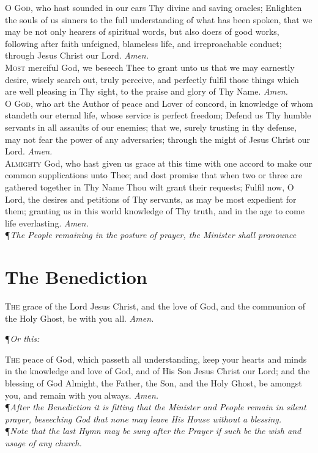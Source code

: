 \noindent\lettrine{O}{ God}, who hast sounded in our ears Thy divine and saving oracles; Enlighten the souls of us sinners to the full understanding of what has been spoken, that we may be not only hearers of spiritual words, but also doers of good works, following after faith unfeigned, blameless life, and irreproachable conduct; through Jesus Christ our Lord.
\textit{Amen.} \\

\noindent\lettrine{M}{ost} merciful God, we beseech Thee to grant unto us that we may earnestly desire, wisely search out, truly perceive, and perfectly fulfil those things which are well pleasing in Thy sight, to the praise and glory of Thy Name.
\textit{Amen.} \\

\noindent\lettrine{O}{ God,} who art the Author of peace and Lover of concord, in knowledge of whom standeth our eternal life, whose service is perfect freedom; Defend us Thy humble servants in all assaults of our enemies; that we, surely trusting in thy defense, may not fear the power of any adversaries; through the might of Jesus Christ our Lord.
\textit{Amen.} \\

\noindent\lettrine{A}{lmighty} God, who hast given us grace at this time with one accord to make our common supplications unto Thee; and dost promise that when two or three are gathered together in Thy Name Thou wilt grant their requests; Fulfil now, O Lord, the desires and petitions of Thy servants, as may be most expedient for them; granting us in this world knowledge of Thy truth, and in the age to come life everlasting.
\textit{Amen.} \\

\noindent\P \textit{The People remaining in the posture of prayer, the Minister shall pronounce}

\section*{The Benediction}

\lettrine{T}{he} grace of the Lord Jesus Christ, and the love of God, and the communion of the Holy Ghost, be with you all.
\textit{Amen.} \\

{\centering \P \textit{Or this:} \par}
\vspace{1ex}
\noindent\lettrine{T}{he} peace of God, which passeth all understanding, keep your hearts and minds in the knowledge and love of God, and of His Son Jesus Christ our Lord; and the blessing of God Almight, the Father, the Son, and the Holy Ghost, be amongst you, and remain with you always.
\textit{Amen.} \\

\noindent\P \textit{After the Benediction it is fitting that the Minister and People remain in silent prayer, beseeching God that none may leave His House without a blessing.} \\

\noindent\P \textit{Note that the last Hymn may be sung after the Prayer if such be the wish and usage of any church.}

